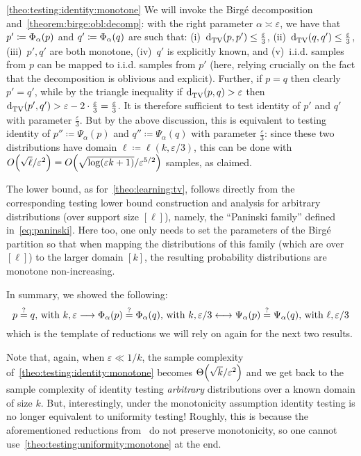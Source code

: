 \documentclass[11pt]{article}
\newcommand{\birgered}[2][\D]{\Psi_{#2}(#1)}
\newcommand{\dst}{\varepsilon}
\newcommand{\ab}{k}
\renewcommand{\eqdef}{\coloneqq}
\newcommand{\p}{p}
\newcommand{\q}{q}
\begin{document}
\begin{proofof}{\autoref{theo:testing:identity:monotone}}
We will invoke the Birg\'e decomposition and~\autoref{theorem:birge:obl:decomp}: with the right parameter $\alpha \asymp \dst$, we have that $\p' \eqdef \birge[\p]{\alpha}$ and $\q' \eqdef \birge[\q]{\alpha}$ are such that: (i)~$\totalvardist{\p}{\p'} \leq \frac{\dst}{3}$, (ii)~$\totalvardist{\q}{\q'} \leq \frac{\dst}{3}$, (iii)~$\p',\q'$ are both monotone, (iv)~$\q'$ is explicitly known, and (v)~i.i.d. samples from $\p$ can be mapped to i.i.d. samples from $\p'$ (here, relying crucially on the fact that the decomposition is oblivious and explicit). Further, if $\p=\q$ then clearly $\p'=\q'$, while by the triangle inequality if $\totalvardist{\p}{\q} > \dst$ then $\totalvardist{\p'}{\q'} > \dst - 2\cdot \frac{\dst}{3} = \frac{\dst}{3}$.  
It is therefore sufficient to test identity of $\p'$ and $\q'$ with parameter $\frac{\dst}{3}$. But by the above discussion, this is equivalent to testing identity of $\p'' \eqdef \birgered[\p]{\alpha}$ and $\q'' \eqdef \birgered[\q]{\alpha}$ with parameter $\frac{\dst}{3}$: since these two distributions have domain $\ell\eqdef \ell(\ab,\dst/3)$, this can be done with $\bigO{\sqrt{\ell}/\dst^2} = \bigO{\sqrt{\log(\dst\ab+1)}/\dst^{5/2}}$ samples, as claimed.

The lower bound, as for~\autoref{theo:learning:tv}, follows directly from the corresponding testing lower bound construction and analysis for arbitrary distributions (over support size $[\ell]$), namely, the ``Paninski family'' defined in~\eqref{eq:paninski}. Here too, one only needs to set the parameters of the Birg\'e partition so that when mapping the distributions of this family (which are over $[\ell]$) to the larger domain $[\ab]$, the resulting probability distributions are monotone non-increasing.
\end{proofof}

\noindent In summary, we showed the following:
\[
    \text{$\p\stackrel{?}{=}\q$, with $\ab,\dst$} \longrightarrow \text{$\birge[\p]{\alpha}\stackrel{?}{=}\birge[\q]{\alpha}$, with $\ab,\dst/3$} \longleftrightarrow \text{$\birgered[\p]{\alpha}\stackrel{?}{=}\birgered[\q]{\alpha}$, with $\ell,\dst/3$}
\]
which is the template of reductions we will rely on again for the next two results.

\begin{remark}
Note that, again, when $\dst \ll 1/\ab$, the sample complexity of~\autoref{theo:testing:identity:monotone} becomes $\bigTheta{\sqrt{\ab}/\dst^2}$ and we get back to the sample complexity of identity testing \emph{arbitrary} distributions over a known domain of size $\ab$. But, interestingly, under the monotonicity assumption identity testing is no longer equivalent to uniformity testing! Roughly, this is because the aforementioned reductions from~\cite{DK:16,Goldreich:16,ACT:19} do not preserve monotonicity, so one cannot use~\autoref{theo:testing:uniformity:monotone} at the end.
\end{remark}
\end{document}
